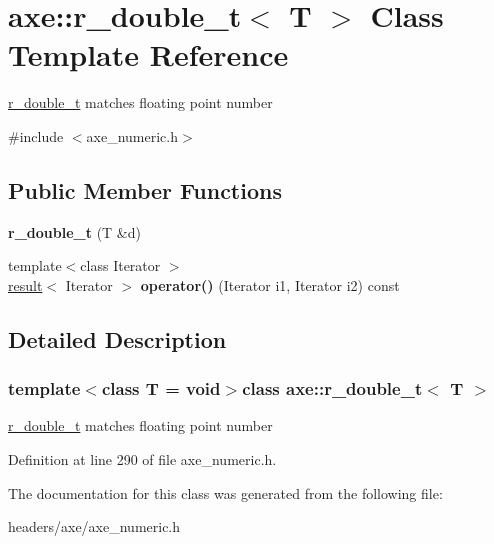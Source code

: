 \hypertarget{classaxe_1_1r__double__t}{\section{axe\+:\+:r\+\_\+double\+\_\+t$<$ T $>$ Class Template Reference}
\label{classaxe_1_1r__double__t}
}


\hyperlink{classaxe_1_1r__double__t}{r\+\_\+double\+\_\+t} matches floating point number  




{\ttfamily \#include $<$axe\+\_\+numeric.\+h$>$}

\subsection*{Public Member Functions}
\begin{DoxyCompactItemize}
\item 
\hypertarget{classaxe_1_1r__double__t_affc1d8887a6d42046c04013b89a8bc81}{{\bfseries r\+\_\+double\+\_\+t} (T \&d)}\label{classaxe_1_1r__double__t_affc1d8887a6d42046c04013b89a8bc81}

\item 
\hypertarget{classaxe_1_1r__double__t_a906d5014ff98ddb40fa761c42f93587f}{{\footnotesize template$<$class Iterator $>$ }\\\hyperlink{structaxe_1_1result}{result}$<$ Iterator $>$ {\bfseries operator()} (Iterator i1, Iterator i2) const }\label{classaxe_1_1r__double__t_a906d5014ff98ddb40fa761c42f93587f}

\end{DoxyCompactItemize}


\subsection{Detailed Description}
\subsubsection*{template$<$class T = void$>$class axe\+::r\+\_\+double\+\_\+t$<$ T $>$}

\hyperlink{classaxe_1_1r__double__t}{r\+\_\+double\+\_\+t} matches floating point number 

Definition at line 290 of file axe\+\_\+numeric.\+h.



The documentation for this class was generated from the following file\+:\begin{DoxyCompactItemize}
\item 
headers/axe/axe\+\_\+numeric.\+h\end{DoxyCompactItemize}
